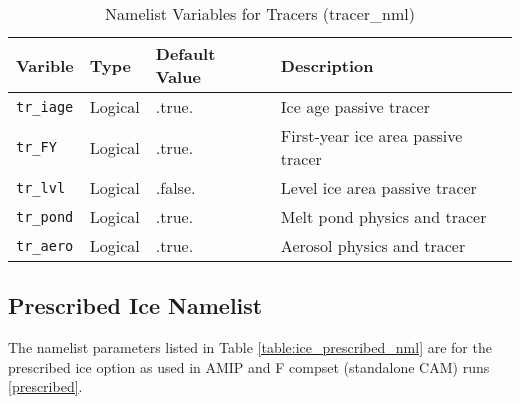 \begin{table}
  \begin{center}
  \caption{Namelist Variables for Tracers (tracer_nml)}
  \label{table:tracer_nml}
  \begin{tabular}{p{2.5cm}p{2.5cm}p{3cm}p{6.0cm}} \hline
  Varible & Type & Default Value & Description               \\
\hline \hline

{\tt tr\_iage} & Logical & .true. &  Ice age passive tracer \\

{\tt tr\_FY} & Logical & .true. &  First-year ice area passive tracer \\

{\tt tr\_lvl} & Logical & .false. &  Level ice area passive tracer \\

{\tt tr\_pond} & Logical & .true. &  Melt pond physics and tracer \\

{\tt tr\_aero} & Logical & .true. &  Aerosol physics and tracer \\

  \hline
  \end{tabular}
  \end{center}
\end{table}

\subsection{Prescribed Ice Namelist}

The namelist parameters listed in Table \ref{table:ice_prescribed_nml} are for
the prescribed ice option as used in AMIP and F compset (standalone CAM) runs
\ref{prescribed}.

